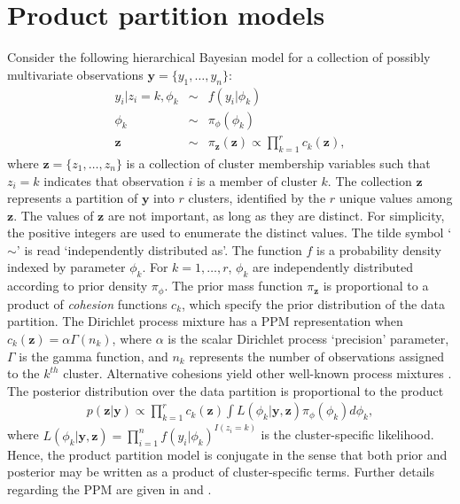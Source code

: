 \documentclass[article, nojss]{jss}
\newcommand{\bz}{\boldsymbol{z}}
\newcommand{\by}{\boldsymbol{y}}
\begin{document}
\section[PPMs]{Product partition models} \label{PPMs}
Consider the following hierarchical Bayesian model for a collection of possibly multivariate observations $\by = \{y_1, \ldots, y_n\}$:
\begin{eqnarray}
y_i | z_i = k, \phi_k & \sim & f(y_i|\phi_k) \nonumber \\
\phi_k & \sim & \pi_{\phi}(\phi_k) \nonumber \\
\bz & \sim & \pi_{\bz}(\bz) \propto \prod_{k=1}^r c_k(\bz), \nonumber
\end{eqnarray}
where $\bz = \{z_1, \ldots, z_n\}$ is a collection of cluster membership variables such that $z_i = k$ indicates that observation $i$ is a member of cluster $k$. The collection $\bz$ represents a partition of $\by$ into $r$ clusters, identified by the $r$ unique values among $\bz$. The values of $\bz$ are not important, as long as they are distinct. For simplicity, the positive integers are used to enumerate the distinct values. The tilde symbol `$\sim$' is read `independently distributed as'. The function $f$ is a probability density indexed by parameter $\phi_k$. For $k = 1,\ldots,r$, $\phi_k$ are independently distributed according to prior density $\pi_{\phi}$. The prior mass function $\pi_{\bz}$ is proportional to a product of {\it cohesion} functions $c_k$, which specify the prior distribution of the data partition. The Dirichlet process mixture has a PPM representation when $c_k(\bz) = \alpha\Gamma(n_k)$, where $\alpha$ is the scalar Dirichlet process `precision' parameter, $\Gamma$ is the gamma function, and $n_k$ represents the number of observations assigned to the $k^{th}$ cluster. Alternative cohesions yield other well-known process mixtures \citep[for a partial listing, see][]{LauGreen2007}. The posterior distribution over the data partition is proportional to the product
\begin{eqnarray}
p(\bz|\by) \propto \prod_{k=1}^r c_k(\bz) \int L(\phi_k|\by,\bz) \pi_{\phi}(\phi_k) d\phi_k , \label{eqn:posterior}
\end{eqnarray}
where $L(\phi_k|\by,\bz) = \prod_{i=1}^n f(y_i|\phi_k)^{I(z_i=k)}$ is the cluster-specific likelihood. Hence, the product partition model is conjugate in the sense that both prior and posterior may be written as a product of cluster-specific terms. Further details regarding the PPM are given in \citet{Hartigan1990} and \citet{BarryHartigan1992}.
\end{document}
